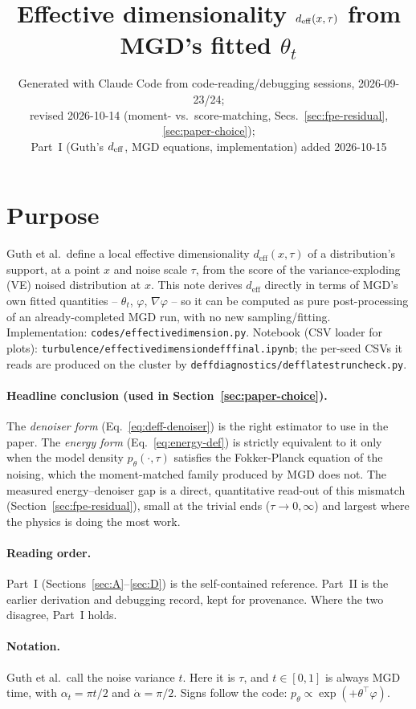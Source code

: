 \documentclass[11pt]{article}
\title{Effective dimensionality $\deff(x,\tau)$ from MGD's fitted $\theta_t$}
\author{\normalsize Generated with Claude Code from code-reading/debugging sessions, 2026-09-23/24;\\
  \normalsize revised 2026-10-14 (moment- vs.\ score-matching, Secs.~\ref{sec:fpe-residual}, \ref{sec:paper-choice});\\
  \normalsize Part~I (Guth's $\deff$, MGD equations, implementation) added 2026-10-15}
\date{}
\newcommand{\code}[1]{\texttt{#1}}
\renewcommand{\_}{\origunderscore\allowbreak}
\newcommand{\deff}{d_{\mathrm{eff}}}
\begin{document}
\maketitle

\section*{Purpose}

Guth et al.\ define a local effective dimensionality $\deff(x,\tau)$ of a
distribution's support, at a point $x$ and noise scale $\tau$, from the
score of the variance-exploding (VE) noised distribution at $x$. This note
derives $\deff$ directly in terms of MGD's own fitted quantities --
$\theta_t$, $\varphi$, $\nabla\varphi$ -- so it can be computed as pure
post-processing of an already-completed MGD run, with no new
sampling/fitting. Implementation: \code{codes/effective\_dimension.py}.
Notebook (CSV loader for plots):
\code{turbulence/effective\_dimension\_deff\_final.ipynb}; the per-seed CSVs
it reads are produced on the cluster by
\code{deff\_diagnostics/deff\_latest\_run\_check.py}.

\paragraph{Headline conclusion (used in Section~\ref{sec:paper-choice}).}
The \emph{denoiser form} (Eq.~\ref{eq:deff-denoiser}) is the right estimator
to use in the paper. The \emph{energy form}
(Eq.~\ref{eq:energy-def}) is strictly equivalent to it only when the model
density $p_\theta(\cdot,\tau)$ satisfies the Fokker-Planck equation of the
noising, which the moment-matched family produced by MGD does not. The
measured energy--denoiser gap is a direct, quantitative read-out of this
mismatch (Section~\ref{sec:fpe-residual}), small at the trivial ends
($\tau\to0,\infty$) and largest where the physics is doing the most work.

\paragraph{Reading order.} Part~I (Sections~\ref{sec:A}--\ref{sec:D}) is
the self-contained reference. Part~II is the earlier derivation and
debugging record, kept for provenance. Where the two disagree, Part~I holds.

\paragraph{Notation.} Guth et al.\ call the noise variance $t$. Here it
is $\tau$, and $t\in[0,1]$ is always MGD time, with $\alpha_t=\pi t/2$ and
$\dot\alpha=\pi/2$. Signs follow the code: $p_\theta\propto\exp(+\theta^\top\varphi)$.
\end{document}
